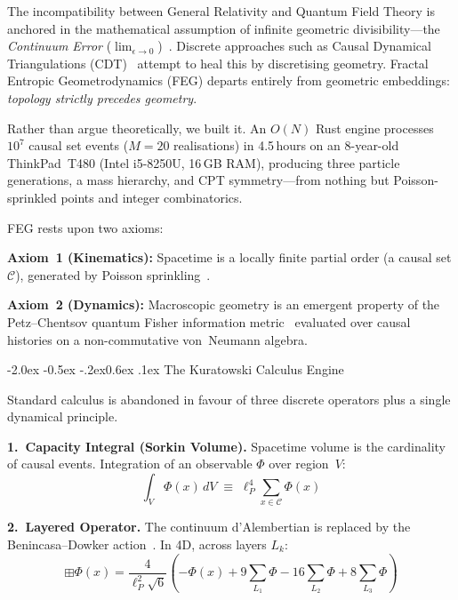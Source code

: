 \documentclass[aps,prl,twocolumn,superscriptaddress,nofootinbib,amsmath,amssymb,floatfix]{revtex4-2}
\makeatletter
\def\sec@upcase#1{\uppercase{#1}}
\renewcommand\section{\@startsection{section}{1}{\z@}%
  {-2.0ex \@plus -0.5ex \@minus -.2ex}{0.6ex \@plus .1ex}%
  {\normalfont\small\bfseries\centering\sec@upcase}}
\makeatother
\begin{document}
The incompatibility between General Relativity and Quantum Field Theory
is anchored in the mathematical assumption of infinite geometric
divisibility---the \emph{Continuum Error}
($\lim_{\epsilon \to 0}$)~\cite{einstein1915,wald1984}.
Discrete approaches such as Causal Dynamical Triangulations
(CDT)~\cite{ambjorn1998,loll2019} attempt to heal this by discretising
geometry.  Fractal Entropic Geometrodynamics (FEG) departs entirely from
geometric embeddings: \emph{topology strictly precedes geometry}.

Rather than argue theoretically, we built it.  An $O(N)$ Rust engine
processes $10^7$ causal set events ($M = 20$ realisations) in
4.5\,hours on an 8-year-old ThinkPad~T480 (Intel i5-8250U, 16\,GB RAM),
producing three particle generations,
a mass hierarchy, and CPT symmetry---from nothing but Poisson-sprinkled
points and integer combinatorics.

FEG rests upon two axioms:

\textbf{Axiom~1 (Kinematics):} Spacetime is a locally finite partial order
(a causal set $\mathcal{C}$), generated by Poisson
sprinkling~\cite{bombelli1987,bombelli2009}.

\textbf{Axiom~2 (Dynamics):} Macroscopic geometry is an emergent property of
the Petz--Chentsov quantum Fisher information metric~\cite{petz1996,chentsov1982}
evaluated over causal histories on a non-commutative von~Neumann algebra.

\section{The Kuratowski Calculus Engine}\label{sec:engine}

Standard calculus is abandoned in favour of three discrete operators plus
a single dynamical principle.

\textbf{1.\ Capacity Integral (Sorkin Volume).}
Spacetime volume is the cardinality of causal events.
Integration of an observable $\Phi$ over region~$V$:
\begin{equation}
    \int_V \Phi(x)\,dV \;\equiv\; \ell_P^4 \sum_{x \in \mathcal{C}} \Phi(x)
\end{equation}

\textbf{2.\ Layered Operator.}
The continuum d'Alembertian is replaced by the Benincasa--Dowker
action~\cite{benincasa2010}.  In 4D, across layers $L_k$:
\begin{equation}
    \boxplus\Phi(x) = \frac{4}{\ell_P^2\sqrt{6}}\!\left(
      -\Phi(x) + 9\!\sum_{L_1}\!\Phi
      - 16\!\sum_{L_2}\!\Phi + 8\!\sum_{L_3}\!\Phi \right)
\end{equation}
\end{document}
